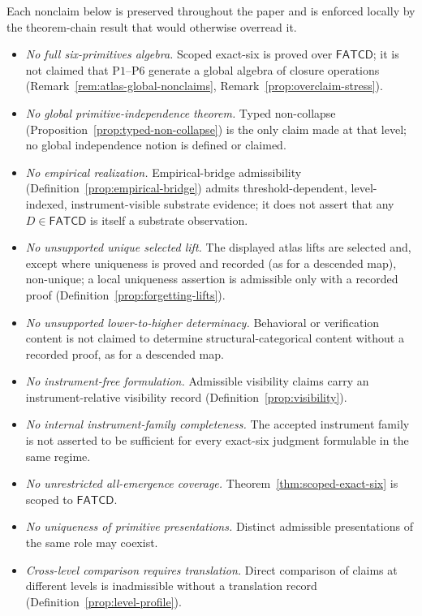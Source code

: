 \documentclass[11pt]{article}
\theoremstyle{definition}
\newcommand{\FATCD}{\ensuremath{\mathsf{FATCD}}}
\newcommand{\Pone}{\ensuremath{\mathrm{P1}}}
\newcommand{\Psix}{\ensuremath{\mathrm{P6}}}
\begin{document}
Each nonclaim below is preserved throughout the paper and is enforced
locally by the theorem-chain result that would otherwise overread it.

\begin{itemize}[topsep=2pt,itemsep=1pt]
  \item \emph{No full six-primitives algebra.} Scoped exact-six is
    proved over \FATCD{}; it is not claimed that \Pone{}--\Psix{}
    generate a global algebra of closure operations
    (Remark~\ref{rem:atlas-global-nonclaims},
    Remark~\ref{prop:overclaim-stress}).
  \item \emph{No global primitive-independence theorem.} Typed
    non-collapse (Proposition~\ref{prop:typed-non-collapse}) is the
    only claim made at that level; no global independence notion is defined
    or claimed.
  \item \emph{No empirical realization.} Empirical-bridge admissibility
    (Definition~\ref{prop:empirical-bridge}) admits
    threshold-dependent, level-indexed, instrument-visible substrate
    evidence; it does not assert that any \(D \in \FATCD{}\) is itself
    a substrate observation.
  \item \emph{No unsupported unique selected lift.} The displayed atlas lifts
    are selected and, except where uniqueness is proved and recorded (as for
    a descended map), non-unique; a local uniqueness assertion is admissible
    only with a recorded proof (Definition~\ref{prop:forgetting-lifts}).
  \item \emph{No unsupported lower-to-higher determinacy.} Behavioral or
    verification content is not claimed to determine structural-categorical
    content without a recorded proof, as for a descended map.
  \item \emph{No instrument-free formulation.} Admissible visibility claims carry
    an instrument-relative visibility record
    (Definition~\ref{prop:visibility}).
  \item \emph{No internal instrument-family completeness.} The
    accepted instrument family is not asserted to be sufficient for
    every exact-six judgment formulable in the same regime.
  \item \emph{No unrestricted all-emergence coverage.}
    Theorem~\ref{thm:scoped-exact-six} is scoped to \FATCD{}.
  \item \emph{No uniqueness of primitive presentations.} Distinct
    admissible presentations of the same role may coexist.
  \item \emph{Cross-level comparison requires translation.} Direct
    comparison of claims at different levels is inadmissible without a
    translation record (Definition~\ref{prop:level-profile}).
\end{itemize}
\end{document}
